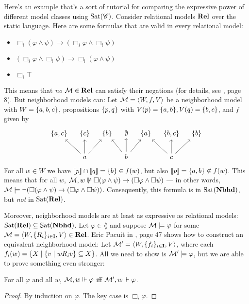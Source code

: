\documentclass[letterpaper]{article}
\begin{document}
\begin{example*}
    Here's an example that's a sort of tutorial for comparing the expressive power of different model classes using $\mathrm{Sat}( \mathscr{C} )$.  Consider relational models $\textrm{\textbf{Rel}}$ over the static language.  Here are some formulas that are valid in every relational model:
    \begin{itemize}
        \item $\Box_i(\varphi \land \psi) \to (\Box_i \varphi \land \Box_i \psi)$
        \item $(\Box_i \varphi \land \Box_i \psi) \to \Box_i(\varphi \land \psi)$
        \item $\Box_i \top$
    \end{itemize}
    This means that \emph{no} $\mathcal{M} \in \textrm{\textbf{Rel}}$ can satisfy their negations (for details, see \cite{pacuit2017neighborhood}, page 8).  But neighborhood models can: Let $\mathcal{M} = \langle W, f, V \rangle$ be a neighborhood model with $W = \{ a, b, c \}$, propositions $\{ p, q \}$ with $V(p) = \{ a, b \}, V(q) = \{ b, c \}$, and $f$ given by
    \[
    \begin{tikzcd}[column sep=1em]
        \set{a, c} & \set{c} & \set{b} & \emptyset & \set{a} & \set{b,c} & \set{b} \\
           &  a \arrow{lu} \arrow{u} \arrow{ru}  &     &  b \arrow{lu} \arrow{u} \arrow{ru}  &    &  c \arrow{lu} \arrow{u} \arrow{ru} &
    \end{tikzcd}
    \]
    For all $w \in W$ we have $[\![\mbox{\em $ p $\/}]\!] \cap [\![\mbox{\em $ q $\/}]\!] = \{ b \} \in f(w)$, but also $[\![\mbox{\em $ p $\/}]\!] = \{ a, b \} \not \in f(w)$. This means that for all $w$, $\mathcal{M}, w \not \Vdash \Box(\varphi \land \psi) \to (\Box \varphi \land \Box \psi)$ --- in other words, $\mathcal{M} \models \neg (\Box(\varphi \land \psi) \to (\Box \varphi \land \Box \psi))$.  Consequently, this formula is in $\mathrm{Sat}( \textrm{\textbf{Nbhd}} )$, but \emph{not} in $\mathrm{Sat}( \textrm{\textbf{Rel}} )$.
    
    Moreover, neighborhood models are at least as expressive as relational models: $\mathrm{Sat}( \textrm{\textbf{Rel}} ) \subseteq \mathrm{Sat}( \textrm{\textbf{Nbhd}} )$.  Let $\varphi \in \lang$ and suppose $\mathcal{M} \models \varphi$ for some $\mathcal{M} = \langle W, \{ R_i \}_{i \in \textbf{I}}, V \rangle \in \textrm{\textbf{Rel}}$.  Eric Pacuit in \cite{pacuit2017neighborhood}, page 47 shows how to construct an equivalent neighborhood model:  Let $\mathcal{M}' = \langle W, \{ f_i \}_{i \in \textbf{I}}, V \rangle$, where each $f_i(w) = \{ X \mid \{ v \mid w{R_i}v  \} \subseteq X \}$.  All we need to show is $\mathcal{M}' \models \varphi$, but we are able to prove something even stronger:
    \begin{proposition}
        For all $\varphi$ and all $w$, $\mathcal{M}, w \Vdash \varphi$ iff $\mathcal{M}', w \Vdash \varphi$.
    \end{proposition}
    \begin{proof}
        By induction on $\varphi$.  The key case is $\Box_i \varphi$.  
        

\end{proof}
\end{example*}
\end{document}
